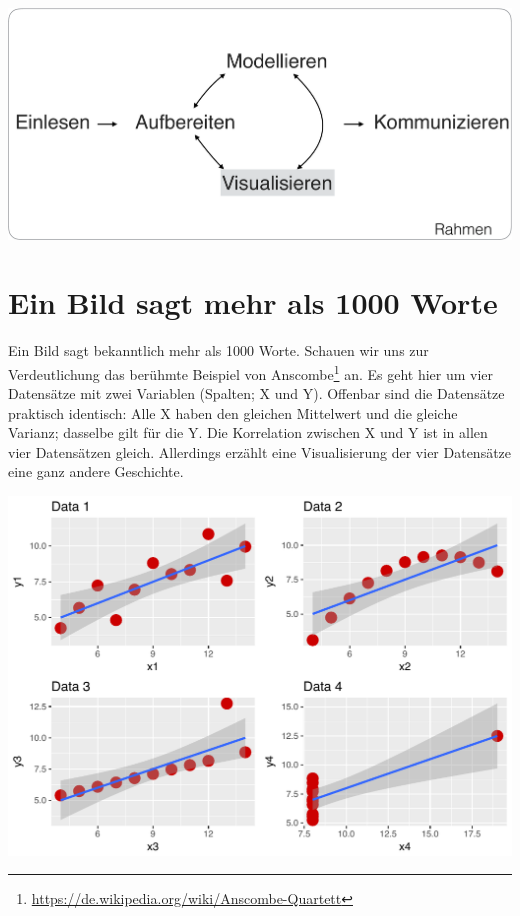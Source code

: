 \documentclass[12pt,ngerman,paper=a4,pagesize,DIV=13]{scrreprt}
\begin{document}
\includegraphics{Inhalte/images/visualisieren/Visualisieren.pdf}

\hypertarget{ein-bild-sagt-mehr-als-1000-worte}{%
\section{Ein Bild sagt mehr als 1000
Worte}\label{ein-bild-sagt-mehr-als-1000-worte}}

Ein Bild sagt bekanntlich mehr als 1000 Worte. Schauen wir uns zur
Verdeutlichung das berühmte Beispiel von Anscombe\footnote{\url{https://de.wikipedia.org/wiki/Anscombe-Quartett}}
an. Es geht hier um vier Datensätze mit zwei Variablen (Spalten; X und
Y). Offenbar sind die Datensätze praktisch identisch: Alle X haben den
gleichen Mittelwert und die gleiche Varianz; dasselbe gilt für die Y.
Die Korrelation zwischen X und Y ist in allen vier Datensätzen gleich.
Allerdings erzählt eine Visualisierung der vier Datensätze eine ganz
andere Geschichte.

\includegraphics{Inhalte/images/visualisieren/anscombe.pdf}
\end{document}
